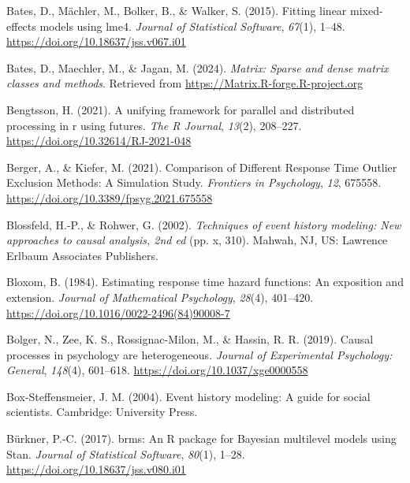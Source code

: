 \documentclass[
  man, donotrepeattitle,floatsintext]{apa6}
\newlength{\cslhangindent}
\newenvironment{CSLReferences}[2] %
 {\begin{list}{}{%
  \setlength{\itemindent}{0pt}
  \setlength{\leftmargin}{0pt}
  \setlength{\parsep}{0pt}
  \ifodd #1
   \setlength{\leftmargin}{\cslhangindent}
   \setlength{\itemindent}{-1\cslhangindent}
  \fi
  \setlength{\itemsep}{#2\baselineskip}}}
 {\end{list}}
\begin{document}
\begin{CSLReferences}{1}{0}
Bates, D., Mächler, M., Bolker, B., \& Walker, S. (2015). Fitting linear mixed-effects models using {lme4}. \emph{Journal of Statistical Software}, \emph{67}(1), 1--48. \url{https://doi.org/10.18637/jss.v067.i01}

Bates, D., Maechler, M., \& Jagan, M. (2024). \emph{Matrix: Sparse and dense matrix classes and methods}. Retrieved from \url{https://Matrix.R-forge.R-project.org}

Bengtsson, H. (2021). A unifying framework for parallel and distributed processing in r using futures. \emph{The R Journal}, \emph{13}(2), 208--227. \url{https://doi.org/10.32614/RJ-2021-048}

Berger, A., \& Kiefer, M. (2021). Comparison of {Different Response Time Outlier Exclusion Methods}: {A Simulation Study}. \emph{Frontiers in Psychology}, \emph{12}, 675558. \url{https://doi.org/10.3389/fpsyg.2021.675558}

Blossfeld, H.-P., \& Rohwer, G. (2002). \emph{Techniques of event history modeling: {New} approaches to causal analysis, 2nd ed} (pp. x, 310). Mahwah, NJ, US: Lawrence Erlbaum Associates Publishers.

Bloxom, B. (1984). Estimating response time hazard functions: {An} exposition and extension. \emph{Journal of Mathematical Psychology}, \emph{28}(4), 401--420. \url{https://doi.org/10.1016/0022-2496(84)90008-7}

Bolger, N., Zee, K. S., Rossignac-Milon, M., \& Hassin, R. R. (2019). Causal processes in psychology are heterogeneous. \emph{Journal of Experimental Psychology: General}, \emph{148}(4), 601--618. \url{https://doi.org/10.1037/xge0000558}

Box-Steffensmeier, J. M. (2004). Event history modeling: A guide for social scientists. Cambridge: University Press.

Bürkner, P.-C. (2017). {brms}: An {R} package for {Bayesian} multilevel models using {Stan}. \emph{Journal of Statistical Software}, \emph{80}(1), 1--28. \url{https://doi.org/10.18637/jss.v080.i01}


\end{CSLReferences}
\end{document}
